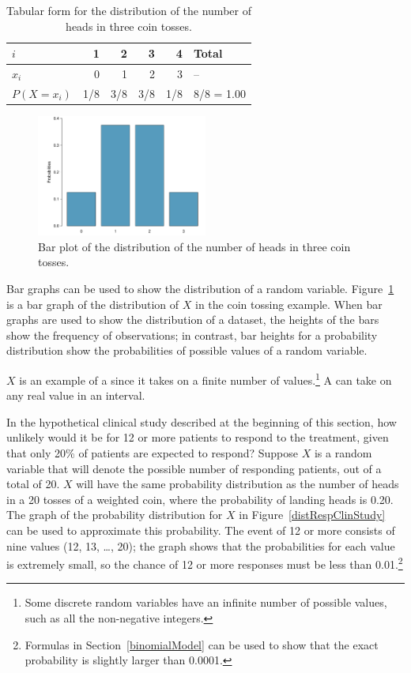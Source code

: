 \begin{table}[h]
	\centering 
	\begin{tabular}{l rrrr l}
		\hline 
		$i$ & 1 & 2 & 3 & 4 & Total\\
		\hline
		$x_i$ & 0 & 1 & 2 & 3 & --\\
		$P(X = x_i)$ & 1/8 & 3/8 & 3/8 & 1/8 & 8/8 = 1.00\\
	\end{tabular}
	\caption{Tabular form for the distribution of the number of heads in three coin tosses.}
	\label{distCoinTossing}
\end{table}

\begin{figure}[h]
	\centering
	\includegraphics[width=0.5\textwidth]
	{ch_distributions_oi_biostat/figures/barPlotCoinTossing/barPlotCoinTossing.pdf}
	\caption{Bar plot of the distribution of the number of heads in three coin tosses.}
	\label{barPlotCoinTossing}
\end{figure}

Bar graphs can be used to show the distribution of a random variable.  Figure~\ref{barPlotCoinTossing} is a bar graph of the distribution of $X$ in the coin tossing example. When bar graphs are used to show the distribution of a dataset, the heights of the bars show the frequency of observations; in contrast, bar heights for a probability distribution show the probabilities of possible values of a random variable.

$X$ is an example of a  since it takes on a finite number of values.\footnote{Some discrete random variables have an infinite number of possible values, such as all the non-negative integers.} A  can take on any real value in an interval. 

In the hypothetical clinical study described at the beginning of this section, how unlikely would it be for 12 or more patients to respond to the treatment, given that only 20\% of patients are expected to respond? Suppose $X$ is a random variable that will denote the possible number of responding patients, out of a total of 20. $X$ will have the same probability distribution as the number of heads in a 20 tosses of a weighted coin, where the probability of landing heads is 0.20. The graph of the probability distribution for $X$ in Figure~\ref{distRespClinStudy} can be used to approximate this probability. The event of 12 or more consists of nine values (12, 13, \dots, 20); the graph shows that the probabilities for each value is extremely small, so the chance of 12 or more responses must be less than 0.01.\footnote{Formulas in Section~\ref{binomialModel} can be used to show that the exact probability is slightly larger than 0.0001.}

